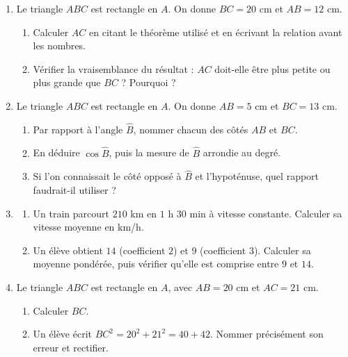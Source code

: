 \documentclass[10pt,a4paper]{article}
\begin{document}
\begin{enumerate}
\needspace{22mm}
\item[\textbf{B1.}] Le triangle $ABC$ est rectangle en $A$. On donne $BC = 20$ cm et $AB = 12$ cm.
\begin{enumerate}
\item Calculer $AC$ en citant le théorème utilisé et en écrivant la relation avant les nombres.
\item Vérifier la vraisemblance du résultat : $AC$ doit-elle être plus petite ou plus grande que $BC$ ? Pourquoi ?
\end{enumerate}
\par\vspace{1.2mm}
\needspace{22mm}
\item[\textbf{B2.}] Le triangle $ABC$ est rectangle en $A$. On donne $AB = 5$ cm et $BC = 13$ cm.
\begin{enumerate}
\item Par rapport à l'angle $\widehat{B}$, nommer chacun des côtés $AB$ et $BC$.
\item En déduire $\cos\widehat{B}$, puis la mesure de $\widehat{B}$ arrondie au degré.
\item Si l'on connaissait le côté opposé à $\widehat{B}$ et l'hypoténuse, quel rapport faudrait-il utiliser ?
\end{enumerate}
\par\vspace{1.2mm}
\needspace{22mm}
\item[\textbf{B3.}] \begin{enumerate}
\item Un train parcourt $210$ km en $1$ h $30$ min à vitesse constante. Calculer sa vitesse moyenne en km/h.
\item Un élève obtient $14$ (coefficient $2$) et $9$ (coefficient $3$). Calculer sa moyenne pondérée, puis vérifier
qu'elle est comprise entre $9$ et $14$.
\end{enumerate}
\par\vspace{1.2mm}
\needspace{22mm}
\item[\textbf{B4.}] Le triangle $ABC$ est rectangle en $A$, avec $AB = 20$ cm et $AC = 21$ cm.
\begin{enumerate}
\item Calculer $BC$.
\item Un élève écrit $BC^2 = 20^2 + 21^2 = 40 + 42$. Nommer précisément son erreur et rectifier.
\end{enumerate}
\par\vspace{1.2mm}
\end{enumerate}
\end{document}
